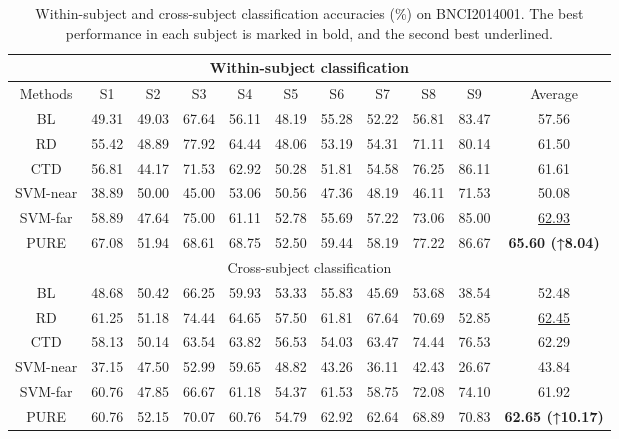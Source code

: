 \documentclass[journal,twocolumn]{IEEEtran}
\begin{document}
\begin{table}[htpb] \centering
  \caption{Within-subject and cross-subject classification accuracies (\%) on BNCI2014001. The best performance in each subject is marked in bold, and the second best underlined.}
  \label{tab:2014001-result}
  \begin{tabular}{c|c|c|c|c|c|c|c|c|c|c}
  \toprule
  \multicolumn{11}{c}{Within-subject classification} \\
  \midrule
  Methods & S1 & S2 & S3 & S4 & S5 & S6 & S7 & S8 & S9 & Average \\
  \midrule
  BL & 49.31 & 49.03 & 67.64 & 56.11 & 48.19 & 55.28 & 52.22 & 56.81 & 83.47 & 57.56 \\
  RD & 55.42 & 48.89 & 77.92 & 64.44 & 48.06 & 53.19 & 54.31 & 71.11 & 80.14 & 61.50 \\
  CTD & 56.81 & 44.17 & 71.53 & 62.92 & 50.28 & 51.81 & 54.58 & 76.25 & 86.11 & 61.61 \\
  SVM-near & 38.89 & 50.00 & 45.00 & 53.06 & 50.56 & 47.36 & 48.19 & 46.11 & 71.53 & 50.08 \\
  SVM-far & 58.89 & 47.64 & 75.00 & 61.11 & 52.78 & 55.69 & 57.22 & 73.06 & 85.00 & \underline{62.93} \\
  PURE & 67.08 & 51.94 & 68.61 & 68.75 & 52.50 & 59.44 & 58.19 & 77.22 & 86.67 & \textbf{65.60 (↑8.04)} \\
  \midrule
  \multicolumn{11}{c}{Cross-subject classification} \\
  \midrule
  BL & 48.68 & 50.42 & 66.25 & 59.93 & 53.33 & 55.83 & 45.69 & 53.68 & 38.54 & 52.48 \\
  RD & 61.25 & 51.18 & 74.44 & 64.65 & 57.50 & 61.81 & 67.64 & 70.69 & 52.85 & \underline{62.45} \\
  CTD & 58.13 & 50.14 & 63.54 & 63.82 & 56.53 & 54.03 & 63.47 & 74.44 & 76.53 & 62.29 \\
  SVM-near & 37.15 & 47.50 & 52.99 & 59.65 & 48.82 & 43.26 & 36.11 & 42.43 & 26.67 & 43.84 \\
  SVM-far & 60.76 & 47.85 & 66.67 & 61.18 & 54.37 & 61.53 & 58.75 & 72.08 & 74.10 & 61.92 \\
  PURE & 60.76 & 52.15 & 70.07 & 60.76 & 54.79 & 62.92 & 62.64 & 68.89 & 70.83 & \textbf{62.65 (↑10.17)} \\
  \bottomrule
  \end{tabular}
\end{table}
\end{document}
